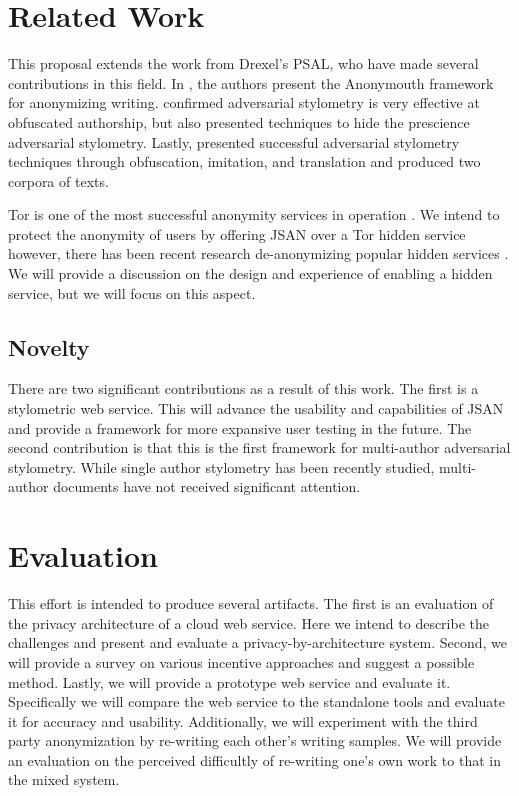 \documentclass[letterpaper]{article}
\begin{document}
\section*{Related Work}\label{sec:related}
This proposal extends the work from Drexel's PSAL, who have made
several contributions in this field.  In
\cite{conf/pet/McDonaldACSG12}, the authors present the Anonymouth
framework for anonymizing writing.
\cite{Afroz:2012:DHF:2310656.2310711} confirmed adversarial stylometry
is very effective at obfuscated authorship, but also presented
techniques to hide the prescience adversarial stylometry.  Lastly,
\cite{journals/tissec/BrennanAG12} presented successful adversarial
stylometry techniques through obfuscation, imitation, and translation
and produced two corpora of texts.

Tor is one of the most successful anonymity services in
operation \cite{Dingledine04tor:the}.  We intend to protect the
anonymity of users by offering JSAN over a Tor hidden service
however, there has been recent research de-anonymizing popular hidden
services \cite{oakland2013-trawling}.  We will provide a discussion on
the design and experience of enabling a hidden service, but we will
focus on this aspect.

\subsection{Novelty}\label{sec:novelty}

There are two significant contributions as a result of this work.  The
first is a stylometric web service.  This will advance the usability
and capabilities of JSAN and provide a framework for more expansive
user testing in the future.  The second contribution is that this is
the first framework for multi-author adversarial stylometry.  While
single author stylometry has been recently studied, multi-author
documents have not received significant attention.

\section*{Evaluation}\label{sec:evaluation}
This effort is intended to produce several artifacts.  The first is an
evaluation of the privacy architecture of a cloud web service.  Here
we intend to describe the challenges and present and evaluate a
privacy-by-architecture system.  Second, we will provide a survey on
various incentive approaches and suggest a possible method.  Lastly,
we will provide a prototype web service and evaluate it.  Specifically
we will compare the web service to the standalone tools and evaluate
it for accuracy and usability.  Additionally, we will experiment with
the third party anonymization by re-writing each other's writing
samples.  We will provide an evaluation on the perceived difficultly
of re-writing one's own work to that in the mixed system.
\end{document}
